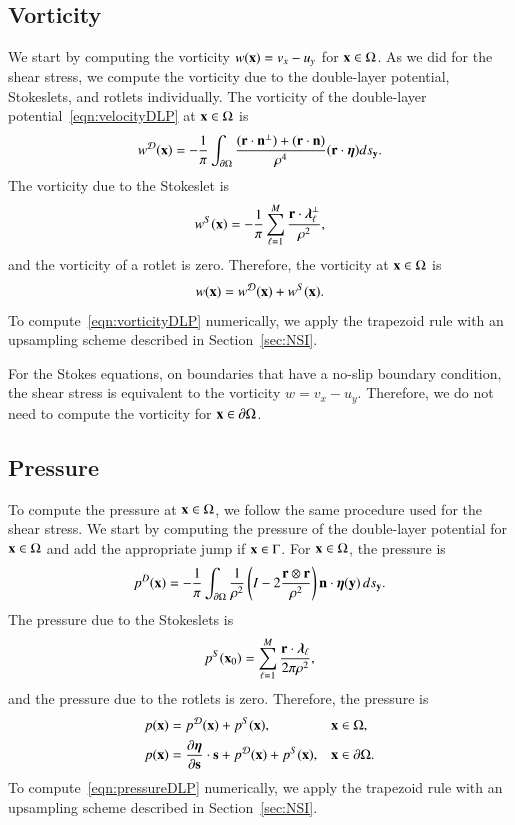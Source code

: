 \documentclass[preprint, 10pt]{elsarticle}
\begin{document}
\subsection{Vorticity}
\label{sec:vorticity}
We start by computing the vorticity $w({\mathbf{x}}) = v_x - u_y$ for ${\mathbf{x}} \in
\Omega$.  As we did for the shear stress, we compute the vorticity due
to the double-layer potential, Stokeslets, and rotlets individually.
The vorticity of the double-layer potential~\eqref{eqn:velocityDLP} at
${\mathbf{x}} \in \Omega$ is
\begin{align}
  w^{{\mathcal{D}}}({\mathbf{x}}) = -\frac{1}{\pi}\int_{{\partial}\Omega} 
    \frac{({\mathbf{r}} \cdot {\mathbf{n}}^\perp) + ({\mathbf{r}} \cdot {\mathbf{n}})}{\rho^4}
    ({\mathbf{r}} \cdot {\boldsymbol\eta}) ds_{{\mathbf{y}}}.
  \label{eqn:vorticityDLP}
\end{align}
The vorticity due to the Stokeslet is
\begin{align*}
  w^S({\mathbf{x}}) = -\frac{1}{\pi} \sum_{\ell=1}^{M} 
    \frac{{\mathbf{r}} \cdot {\boldsymbol\lambda}_\ell^\perp}{\rho^2},
\end{align*}
and the vorticity of a rotlet is zero.  Therefore, the vorticity at ${\mathbf{x}}
\in \Omega$ is
\begin{align*}
  w({\mathbf{x}}) = w^{\mathcal{D}}({\mathbf{x}}) + w^S({\mathbf{x}}).
\end{align*}
To compute~\eqref{eqn:vorticityDLP} numerically, we apply the trapezoid
rule with an upsampling scheme described in Section~\ref{sec:NSI}.

For the Stokes equations, on boundaries that have a no-slip boundary
condition, the shear stress is equivalent to the vorticity $w = v_x -
u_y$.  Therefore, we do not need to compute the vorticity for ${\mathbf{x}} \in
{\partial}\Omega$.

\subsection{Pressure}
\label{sec:pressure}
To compute the pressure at ${\mathbf{x}} \in \Omega$, we follow the
same procedure used for the shear stress.  We start by computing the
pressure of the double-layer potential for ${\mathbf{x}} \in \Omega$ and add the
appropriate jump if ${\mathbf{x}} \in \Gamma$. For ${\mathbf{x}} \in \Omega$, the pressure
is
\begin{align}
  p^{D}({\mathbf{x}}) = -\frac{1}{\pi}\int_{{\partial}\Omega} \frac{1}{\rho^2}
    \left(I - 2 \frac{{\mathbf{r}} \otimes {\mathbf{r}}}{\rho^2}\right) 
    {\mathbf{n}} \cdot {\boldsymbol\eta}({\mathbf{y}}) \,ds_{\mathbf{y}}.
    \label{eqn:pressureDLP}
\end{align}
The pressure due to the Stokeslets is
\begin{align}
  p^S({\mathbf{x}}_0) = \sum_{\ell=1}^{M}\frac{{\mathbf{r}} \cdot {\boldsymbol\lambda}_\ell}{2\pi\rho^2},
  \label{eqn:shearPressureSR}
\end{align}
and the pressure due to the rotlets is zero.  Therefore, the pressure is
\begin{align*}
  p({\mathbf{x}}) &= p^{{\mathcal{D}}}({\mathbf{x}}) + p^{S}({\mathbf{x}}), \quad &&{\mathbf{x}} \in \Omega,\\
  p({\mathbf{x}}) &= \frac{\partial {\boldsymbol\eta}}{\partial {\mathbf{s}}} \cdot {\mathbf{s}} + p^{{\mathcal{D}}}({\mathbf{x}}) + 
              p^{S}({\mathbf{x}}), && {\mathbf{x}} \in {\partial}\Omega.
\end{align*}
To compute~\eqref{eqn:pressureDLP} numerically, we apply the trapezoid
rule with an upsampling scheme described in Section~\ref{sec:NSI}.
\end{document}
